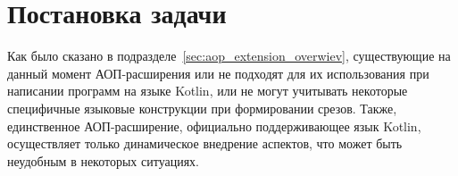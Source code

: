 \chapter{Постановка задачи}
\label{ch:tasks}
Как было сказано в подразделе~\ref{sec:aop_extension_overwiev}, существующие на данный момент АОП-расширения или не подходят для их использования при написании программ на языке Kotlin, или не могут учитывать некоторые специфичные языковые конструкции при формировании срезов.
Также, единственное АОП-расширение, официально поддерживающее язык Kotlin, осуществляет только динамическое внедрение аспектов, что может быть неудобным в некоторых ситуациях.
